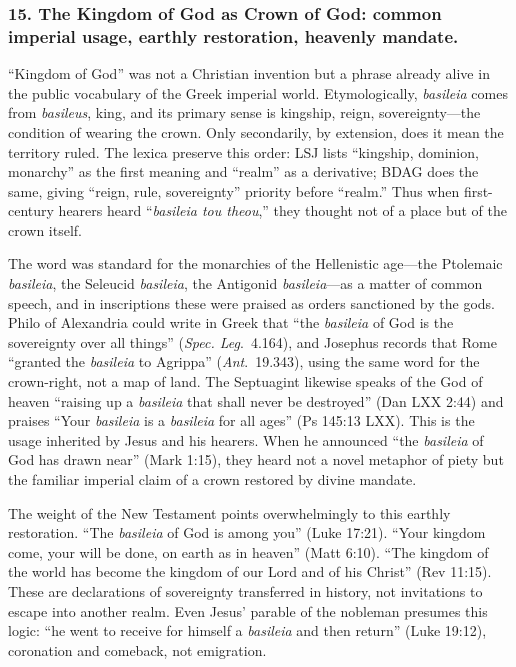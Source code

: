 \subsubsection{15.
The Kingdom of God as Crown of God: common imperial usage, earthly restoration, heavenly mandate.}\label{subsubsec:the-kingdom-of-god-as-crown-of-god-common-imperial-usage-earthly-restoration-heavenly-mandate}
“Kingdom of God” was not a Christian invention but a phrase already alive in the public vocabulary of the Greek imperial world.
Etymologically, \emph{basileia} comes from \emph{basileus}, king, and its primary sense is kingship, reign, sovereignty—the condition of wearing the crown.
Only secondarily, by extension, does it mean the territory ruled.
The lexica preserve this order: LSJ lists “kingship, dominion, monarchy” as the first meaning and “realm” as a derivative; BDAG does the same, giving “reign, rule, sovereignty” priority before “realm.”
Thus when first-century hearers heard “\emph{basileia tou theou},” they thought not of a place but of the crown itself.

The word was standard for the monarchies of the Hellenistic age—the Ptolemaic \emph{basileia}, the Seleucid \emph{basileia}, the Antigonid \emph{basileia}—as a matter of common speech, and in inscriptions these were praised as orders sanctioned by the gods.
Philo of Alexandria could write in Greek that “the \emph{basileia} of God is the sovereignty over all things” (\emph{Spec. Leg}.~4.164), and Josephus records that Rome “granted the \emph{basileia} to Agrippa” (\emph{Ant}.~19.343), using the same word for the crown-right, not a map of land.
The Septuagint likewise speaks of the God of heaven “raising up a \emph{basileia} that shall never be destroyed” (Dan LXX 2:44) and praises “Your \emph{basileia} is a \emph{basileia} for all ages” (Ps 145:13 LXX).
This is the usage inherited by Jesus and his hearers.
When he announced “the \emph{basileia} of God has drawn near” (Mark 1:15), they heard not a novel metaphor of piety but the familiar imperial claim of a crown restored by divine mandate.

The weight of the New Testament points overwhelmingly to this earthly restoration.
“The \emph{basileia} of God is among you” (Luke 17:21).
“Your kingdom come, your will be done, on earth as in heaven” (Matt 6:10).
“The kingdom of the world has become the kingdom of our Lord and of his Christ” (Rev 11:15).
These are declarations of sovereignty transferred in history, not invitations to escape into another realm.
Even Jesus’ parable of the nobleman presumes this logic: “he went to receive for himself a \emph{basileia} and then return” (Luke 19:12), coronation and comeback, not emigration.

